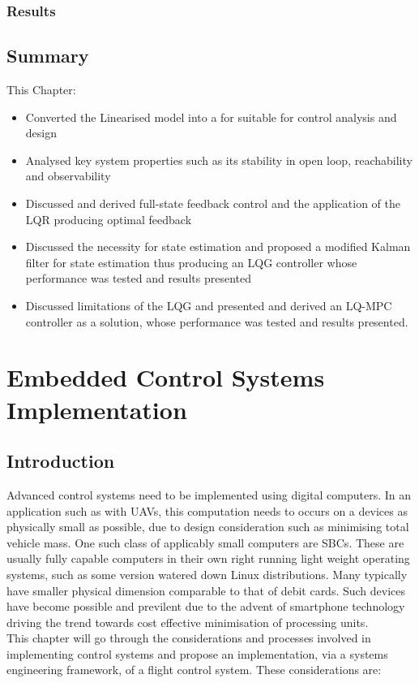 \documentclass[12pt,a4paper,twoside]{report}
\begin{document}
			\subsection{Results}
			
		\section{Summary}
			
			This Chapter:
			\begin{itemize}
				\item 
					Converted the Linearised model into a for suitable for control analysis and design
				\item 
					Analysed key system properties such as its stability in open loop, reachability and observability 
				\item
					Discussed and derived full-state feedback control and the application of the LQR producing optimal feedback
				\item
					Discussed the necessity for state estimation and proposed a modified Kalman filter for state estimation thus producing an LQG controller whose performance was tested and results presented
				\item
					Discussed limitations of the LQG and presented and derived an LQ-MPC controller as a solution, whose performance was tested and results presented.
			\end{itemize}
		
	\newpage
		
	\chapter{Embedded Control Systems Implementation}
		
		\section{Introduction}
			
			Advanced control systems need to be implemented using digital computers. In an application such as with UAVs, this computation needs to occurs on a devices as physically small as possible, due to design consideration such as minimising total vehicle mass. One such class of applicably small computers are SBCs. These are usually fully capable computers in their own right running light weight operating systems, such as some version watered down Linux distributions. Many typically have smaller physical dimension comparable to that of debit cards. Such devices have become possible and previlent due to the advent of smartphone technology driving the trend towards cost effective minimisation of processing units. 
			\\
		 	This chapter will go through the considerations and processes involved in implementing control systems and propose an implementation, via a systems engineering framework, of a flight control system. These considerations are:
			
\end{document}
